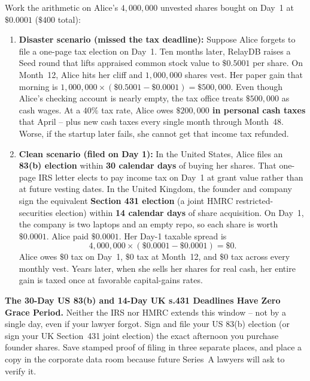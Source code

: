 Work the arithmetic on Alice's $4{,}000{,}000$ unvested shares bought on Day~1 at $\$0.0001$ ($\$400$ total):
\begin{enumerate}
  \item \textbf{Disaster scenario (missed the tax deadline):} Suppose Alice forgets to file a one-page tax election on Day~1. Ten months later, RelayDB raises a Seed round that lifts appraised common stock value to $\$0.5001$ per share. On Month~12, Alice hits her cliff and $1{,}000{,}000$ shares vest. Her paper gain that morning is $1{,}000{,}000 \times (\$0.5001 - \$0.0001) = \$500{,}000$. Even though Alice's checking account is nearly empty, the tax office treats $\$500{,}000$ as cash wages. At a $40\%$ tax rate, Alice owes \textbf{$\$200{,}000$ in personal cash taxes} that April -- plus new cash taxes every single month through Month~48. Worse, if the startup later fails, she cannot get that income tax refunded.
  \item \textbf{Clean scenario (filed on Day 1):} In the United States, Alice files an \textbf{83(b) election} within \textbf{30 calendar days} of buying her shares. That one-page IRS letter elects to pay income tax on Day~1 at grant value rather than at future vesting dates. In the United Kingdom, the founder and company sign the equivalent \textbf{Section 431 election} (a joint HMRC restricted-securities election) within \textbf{14 calendar days} of share acquisition. On Day~1, the company is two laptops and an empty repo, so each share is worth $\$0.0001$. Alice paid $\$0.0001$. Her Day-1 taxable spread is
  \[
    4{,}000{,}000 \times (\$0.0001 - \$0.0001) = \$0.
  \]
  Alice owes \textbf{$\$0$} tax on Day~1, \textbf{$\$0$} tax at Month~12, and \textbf{$\$0$} tax across every monthly vest. Years later, when she sells her shares for real cash, her entire gain is taxed once at favorable capital-gains rates.
\end{enumerate}

\begin{trapbox}
\textbf{The 30-Day US 83(b) and 14-Day UK s.431 Deadlines Have Zero Grace Period.}
Neither the IRS nor HMRC extends this window -- not by a single day, even if your lawyer forgot. Sign and file your US 83(b) election (or sign your UK Section~431 joint election) the exact afternoon you purchase founder shares. Save stamped proof of filing in three separate places, and place a copy in the corporate data room because future Series~A lawyers will ask to verify it.
\end{trapbox}

